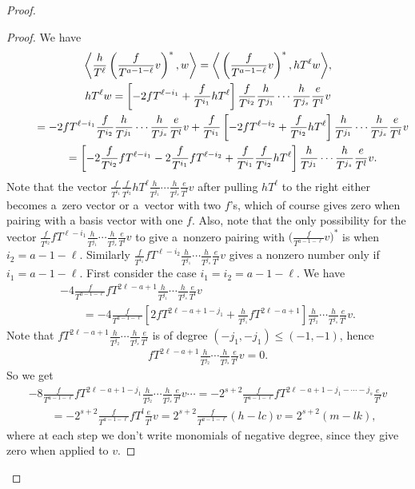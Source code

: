\begin{proof}
\begin{proof}
We have
\begin{gather*}
\bigg\langle \frac{h}{T^\ell} \left(\frac{f}{T^{a-1-\ell}}v\right)^*, w \bigg\rangle = \bigg\langle \left(\frac{f}{T^{a-1-\ell}}v\right)^*, hT^{\ell} w \bigg\rangle,\\
hT^{\ell} w = \left[ -2fT^{\ell-i_1} + \frac{f}{T^{i_1}} hT^{\ell} \right] \frac{f}{T^{i_2}}\frac{h}{T^{j_1}} \cdots \frac{h}{T^{j_s}} \frac{e}{T^l} v \\
\hphantom{hT^{\ell} w} = -2fT^{\ell-i_1} \frac{f}{T^{i_2}}\frac{h}{T^{j_1}} \cdots \frac{h}{T^{j_s}} \frac{e}{T^l} v + \frac{f}{T^{i_1}} \left[ -2fT^{\ell-i_2} + \frac{f}{T^{i_2}} hT^{\ell} \right] \frac{h}{T^{j_1}} \cdots \frac{h}{T^{j_s}} \frac{e}{T^l} v \\
\hphantom{hT^{\ell} w} = \left[ -2 \frac{f}{T^{i_2}} fT^{\ell-i_1} - 2 \frac{f}{T^{i_1}}fT^{\ell-i_2} + \frac{f}{T^{i_1}} \frac{f}{T^{i_2}} hT^{\ell} \right] \frac{h}{T^{j_1}} \cdots \frac{h}{T^{j_s}} \frac{e}{T^l} v.
\end{gather*}
Note that the vector $\frac{f}{T^{i_1}} \frac{f}{T^{i_2}} hT^{\ell} \frac{h}{T^{j_1}} \cdots \frac{h}{T^{j_s}} \frac{e}{T^l} v$ after pulling $hT^{\ell}$ to the right either becomes a~zero vector or a~vector with two $f$'s, which of course gives zero when pairing with a basis vector with one $f$. Also, note that the only possibility for the vector $\frac{f}{T^{i_2}} fT^{\ell-i_1} \frac{h}{T^{j_1}} \cdots \frac{h}{T^{j_s}} \frac{e}{T^l} v$ to give a~nonzero pairing with $\big(\frac{f}{T^{a-1-\ell}}v\big)^*$ is when $i_2 = a-1-\ell$. Similarly $\frac{f}{T^{i_1}} fT^{\ell-i_2} \frac{h}{T^{j_1}} \cdots \frac{h}{T^{j_s}} \frac{e}{T^l} v$ gives a nonzero number only if $i_1 = a-1-\ell$. First consider the case $i_1=i_2=a-1-\ell$. We have
\begin{gather*}
- 4 \frac{f}{T^{a-1-\ell}} fT^{2\ell-a+1} \frac{h}{T^{j_1}} \cdots \frac{h}{T^{j_s}} \frac{e}{T^l} v \\
\qquad{} = - 4 \frac{f}{T^{a-1-\ell}} \left[ 2 fT^{2\ell-a+1-j_1} + \frac{h}{T^{j_1}} fT^{2\ell-a+1} \right] \frac{h}{T^{j_2}} \cdots \frac{h}{T^{j_s}} \frac{e}{T^l} v.
\end{gather*}
Note that $fT^{2\ell-a+1} \frac{h}{T^{j_2}} \cdots \frac{h}{T^{j_s}} \frac{e}{T^l}$ is of degree $(-j_1,-j_1) \leq (-1,-1)$, hence
\begin{gather*} fT^{2\ell-a+1} \frac{h}{T^{j_2}} \cdots \frac{h}{T^{j_s}} \frac{e}{T^l} v =0.\end{gather*} So we get
\begin{gather*}
 -8 \frac{f}{T^{a-1-\ell}} fT^{2\ell-a+1-j_1} \frac{h}{T^{j_2}} \cdots \frac{h}{T^{j_s}} \frac{e}{T^l} v \cdots
 = -2^{s+2} \frac{f}{T^{a-1-\ell}} fT^{2\ell-a+1-j_1-\cdots-j_s} \frac{e}{T^l} v \\
\qquad{} = - 2^{s+2} \frac{f}{T^{a-1-\ell}} fT^{l} \frac{e}{T^l} v = 2^{s+2} \frac{f}{T^{a-1-\ell}} (h - lc) v = 2^{s+2} (m - lk),
\end{gather*}
where at each step we don't write monomials of negative degree, since they give zero when applied to $v$.


\end{proof}
\end{proof}
